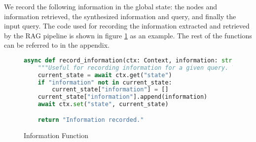 We record the following information in the global state: the nodes and information retrieved, the synthesized information and query, and finally the input query. The code used for recording the information extracted and retrieved by the RAG pipeline is shown in figure \ref{fig:InformationFunc} as an example. The rest of the functions can be referred to in the appendix.

\begin{figure}[h]
	\centering
	\small
	\begin{lstlisting}[language=Python, breaklines=true]
async def record_information(ctx: Context, information: str) -> str:
    """Useful for recording information for a given query. Your input should be information written in plain text."""
    current_state = await ctx.get("state")
    if "information" not in current_state:
        current_state["information"] = []
    current_state["information"].append(information)
    await ctx.set("state", current_state)

    return "Information recorded."
    \end{lstlisting}
	\caption{Information Function}
	\label{fig:InformationFunc}
\end{figure}
